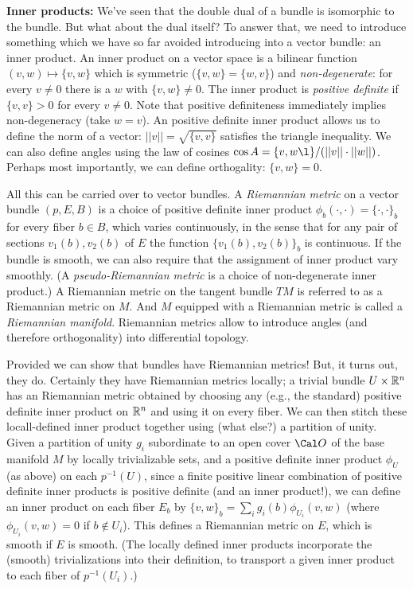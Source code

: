 \msk

{\bf Inner products:} We've seen that the double dual of a bundle is isomorphic to the bundle.
But what about the dual itself? To answer that, we need to introduce something which we have
so far avoided introducing into a vector bundle: an inner product.
An inner product on a vector space is a bilinear function $(v,w)\mapsto \lbrace v,w\rbrace$ which is symmetric
($\lbrace v,w\rbrace=\lbrace w,v\rbrace$) and {\it non-degenerate}: for every $v\neq 0$ there is a $w$ with 
$\lbrace v,w\rbrace\neq 0$. 
The inner product is {\it positive definite} if $\lbrace v,v\rbrace >0$ for every $v\neq 0$.
Note that positive definiteness immediately implies non-degeneracy (take $w=v$). An positive definite
inner product
allows us to define the norm of a vector: $||v||=\sqrt{\lbrace v,v\rbrace}$ satisfies the triangle
inequality. We can also define angles using the law of cosines $\cos A=\lbrace v,w\l\rbrace/(||v||\cdot ||w||)$.
Perhaps most importantly, we can define orthogality: $\lbrace v,w\rbrace =0$.

All this can be carried over to vector bundles. A {\it Riemannian metric} on a vector 
bundle $(p,E,B)$ is a choice of positive definite inner product 
$\phi_b(\cdot,\cdot)=\lbrace\cdot,\cdot\rbrace_b$ for every
fiber $b\in B$, which varies continuously, in the sense that for any pair of sections
$v_1(b),v_2(b)$ of $E$ the function $\lbrace v_1(b),v_2(b)\rbrace_b$ is continuous.
If the bundle is smooth, we can also require that the assignment of inner product vary smoothly.
(A {\it pseudo-Riemannian metric} is a choice of non-degenerate inner product.)
A Riemannian metric on the tangent bundle $TM$ is referred to as a Riemannian metric on $M$.
And $M$ equipped with a Riemannian metric is called a {\it Riemannian manifold}.
Riemannian metrics allow to introduce angles (and therefore orthogonality) into
differential topology.

Provided we can show that bundles have Riemannian metrics! But, it turns out, they do.
Certainly they have Riemannian metrics locally; a trivial bundle $U\times {\Bbb R}^n$
has an Riemannian metric obtained by choosing any (e.g., the standard) positive definite
inner product on ${\Bbb R}^n$ and using it on every fiber. We can then stitch these locall-defined
inner product together using (what else?) a partition of unity. Given a partition of 
unity $g_i$ subordinate to an open cover $\Cal O$ of the base manifold $M$ by locally trivializable sets,
and a positive definite inner product $\phi_U$ (as above) on each $p^{-1}(U)$, since a finite positive
linear combination of positive definite inner products is positive definite (and an inner product!),
we can define an inner product on each fiber $E_b$ by $\lbrace v,w\rbrace_b=\sum_ig_i(b)\phi_{U_i}(v,w)$
(where $\phi_{U_i}(v,w)=0$ if $b\not\in U_i$). This defines a Riemannian metric on $E$, which is smooth
if $E$ is smooth. (The locally defined inner products incorporate the (smooth) trivializations
into their definition, to transport a given inner product to each fiber of $p^{-1}(U_i)$.) 

